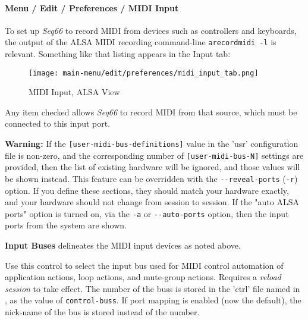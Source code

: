 \paragraph{Menu / Edit / Preferences / MIDI Input}
\label{paragraph:menu_edit_preferences_midi_input}

   To set up \textsl{Seq66} to record MIDI from devices such as
   controllers and keyboards, the output of the ALSA MIDI recording
   command-line \texttt{arecordmidi -l} is relevant.
   Something like that listing appears in the Input tab:

\begin{figure}[H]
   \centering 
   \texttt{[image: main-menu/edit/preferences/midi\_input\_tab.png]}
   \caption{MIDI Input, ALSA View}
   \label{fig:midi_input_tab}
\end{figure}

   Any item checked allows \textsl{Seq66} to record MIDI from that source,
   which must be connected to this input port.

   \textbf{Warning:}
   If the 
   \texttt{[user-midi-bus-definitions]} value in the 'usr' configuration file
   is non-zero, and the
   corresponding number of
   \texttt{[user-midi-bus-N]} settings are provided, then
   the list of existing hardware will be ignored, and those values will be
   shown instead.
   This feature can be overridden with the
   \texttt{-{}-reveal-ports} (\texttt{-r}) option.
   If you define these sections, they should match your
   hardware exactly, and your hardware should not change from session to
   session.
   If the "auto ALSA ports" option is turned on, via the \texttt{-a} or
   \texttt{-{}-auto-ports} option, then
   the input ports from the system are shown.

   \setcounter{ItemCounter}{0}      %

   \textbf{Input Buses} delineates the MIDI input devices as noted above.

   Use this control to select the input bus used for MIDI control automation of 
   application actions, loop actions, and mute-group actions.
   Requires a \textsl{reload session} to take effect.
   The number of the buss is stored in the 'ctrl' file named in
   ,
   as the value of \texttt{control-buss}.
   If port mapping is enabled (now the default),
   the nick-name of the bus is stored instead of the number.


